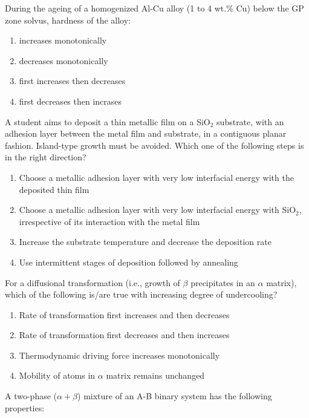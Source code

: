 \bigskip
\item During the ageing of a homogenized Al-Cu alloy (1 to 4 wt.\% Cu) below the GP zone solvus, hardness of the alloy:
\begin{enumerate}
        \item increases monotonically
        \item decreases monotonically
        \item first increases then  decreases
        \item first decreases then incrases 
\end{enumerate}
\bigskip
\item A student aims to deposit a thin metallic film on a SiO$_2$ substrate, with an adhesion layer between the metal film and substrate, in a contiguous planar fashion. Island-type growth must be avoided. Which one of the following steps is in the right direction?
\begin{enumerate}

        \item Choose a metallic adhesion layer with very low interfacial energy with the deposited thin film
        \item Choose a metallic adhesion layer with very low interfacial energy with SiO$_2$, irrespective of its interaction with the metal film
        \item Increase the substrate temperature and decrease the deposition rate
        \item Use intermittent stages of deposition followed by annealing

\end{enumerate}
\bigskip
\item For a diffusional transformation (i.e., growth of $\beta$ precipitates in an $\alpha$ matrix), which of the following is/are true with increasing degree of undercooling? 
\begin{enumerate}
    \item Rate of transformation first increases and then decreases
    \item Rate of transformation first decreases and then increases
    \item Thermodynamic driving force increases monotonically
    \item Mobility of atoms in $\alpha$ matrix remains unchanged

\end{enumerate}
\bigskip
\item A two-phase ($\alpha + \beta$) mixture of an A-B binary system has the following properties:
